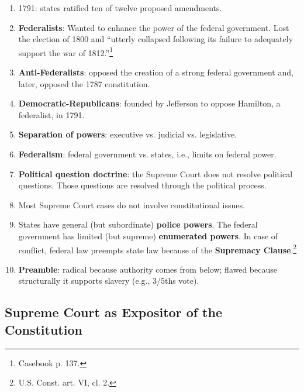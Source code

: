 \begin{enumerate}
\begin{enumerate}
        shall not be done which there is no power to do?~.~.~.~it is evident 
        it would furnish to men disposed to usurp, a plausible pretence for 
        claiming that power.''\footnote{Casebook p. 25.}
        \item Anti-federalist responses to Hamilton's argument pointed out 
        that the Constitution emphasizes limitations elsewhere, e.g., the 
        limitation on granting titles of nobility.\footnote{U.S. Const. art. 
        I, \S\ 9; casebook p. 26.}
    \end{enumerate}
    \item 1791: states ratified ten of twelve proposed amendments.
    \item \textbf{Federalists}: Wanted to enhance the power of the federal 
    government.  Lost the election of 1800 and ``utterly collapsed following 
    its failure to adequately support the war of 1812.''\footnote{Casebook p. 
    137.}
    \item \textbf{Anti-Federalists}: opposed the creation of a strong federal 
    government and, later, opposed the 1787 constitution.
    \item \textbf{Democratic-Republicans}: founded by Jefferson to oppose 
    Hamilton, a federalist, in 1791.
    \item \textbf{Separation of powers}: executive vs. judicial vs. 
    legislative.
    \item \textbf{Federalism}: federal government vs. states, i.e., limits on 
    federal power.
    \item \textbf{Political question doctrine}: the Supreme Court does not 
    resolve political questions. Those questions are resolved through the 
    political process.
    \item Most Supreme Court cases do not involve constitutional issues.
    \item States have general (but subordinate) \textbf{police powers}. The 
    federal government has limited (but supreme) \textbf{enumerated powers}. 
    In case of conflict, federal law preempts state law because of the 
    \textbf{Supremacy Clause}.\footnote{U.S. Const. art. VI, cl. 2.}
    \item \textbf{Preamble}: radical because authority comes from below; 
    flawed because structurally it supports slavery (e.g., 3/5ths vote).
\end{enumerate}

\subsection{Supreme Court as Expositor of the Constitution}

